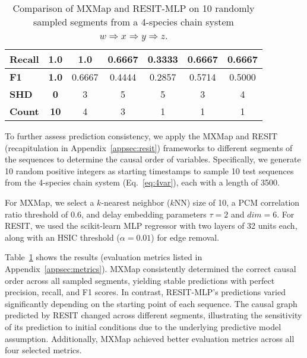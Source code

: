 \begin{table}[htb]
{\begin{tabular}{l|c|ccccc}
\\ \hline
\textbf{Recall}            & \textbf{1.0}    & \multicolumn{1}{c|}{1.0} & \multicolumn{1}{c|}{0.6667} & \multicolumn{1}{c|}{0.3333} & \multicolumn{1}{c|}{0.6667} & 0.6667
\\ \hline
\textbf{F1}            & \textbf{1.0}    & \multicolumn{1}{c|}{0.6667} & \multicolumn{1}{c|}{0.4444} & \multicolumn{1}{c|}{0.2857} & \multicolumn{1}{c|}{0.5714} & 0.5000
\\ \hline
\textbf{SHD}            & \textbf{0}    & \multicolumn{1}{c|}{3} & \multicolumn{1}{c|}{5} & \multicolumn{1}{c|}{5} & \multicolumn{1}{c|}{3} & 4
\\ \hline
\textbf{Count}            & \textbf{10}    & \multicolumn{1}{c|}{4} & \multicolumn{1}{c|}{3} & \multicolumn{1}{c|}{1} & \multicolumn{1}{c|}{1} & 1
\end{tabular}
}

\caption{Comparison of MXMap and RESIT-MLP on 10 randomly sampled segments from a 4-species chain system $w \Rightarrow x \Rightarrow y \Rightarrow z$.}

\label{tab:PredCons}

\end{table}


To further assess prediction consistency, we apply the MXMap and RESIT (recapitulation in Appendix~\ref{appsec:resit}) frameworks to different segments of the sequences to determine the causal order of variables. Specifically, we generate 10 random positive integers as starting timestamps to sample 10 test sequences from the 4-species chain system (Eq.~\ref{eq:4var}), each with a length of 3500.

For MXMap, we select a $k$-nearest neighbor ($k$NN) size of 10, a PCM correlation ratio threshold of 0.6, and delay embedding parameters $\tau = 2$ and $dim = 6$. For RESIT, we used the scikit-learn MLP regressor with two layers of 32 units each, along with an HSIC threshold ($\alpha = 0.01$) for edge removal. 

Table~\ref{tab:PredCons} shows the results (evaluation metrics listed in Appendix~\ref{appsec:metrics}). MXMap consistently determined the correct causal order across all sampled segments, yielding stable predictions with perfect precision, recall, and F1 scores. In contrast, RESIT-MLP's predictions varied significantly depending on the starting point of each sequence. The causal graph predicted by RESIT changed across different segments, illustrating the sensitivity of its prediction to initial conditions due to the underlying predictive model assumption. Additionally, MXMap achieved better evaluation metrics across all four selected metrics.

